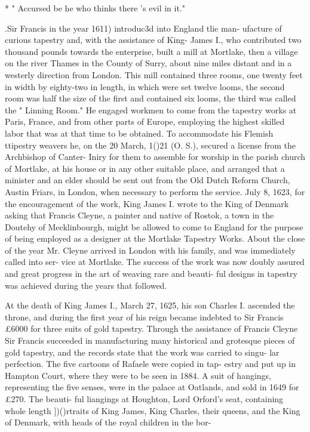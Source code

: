 \documentclass[oneside]{book}
\begin{document}
* " Accursed be he who thinks there 's evil in it." 




.Sir Francis in the year 1611) introduc3d into England tlie man- 
ufacture of curious tapestry and, with the assistance of King- 
James I., who contributed two thousand pounds towards the 
enterprise, built a mill at Mortlake, then a village on the river 
Thames in the County of Surry, about nine miles distant and in 
a westerly direction from London. This mill contained three 
rooms, one twenty feet in width by eighty-two in length, in which 
were set twelve looms, the second room was half the size of the 
first and contained six looms, the third was called the " Linning 
Room." He engaged workmen to come from the tapestry works 
at Paris, France, and from other parts of Europe, employing the 
highest skilled labor that was at that time to be obtained. To 
accommodate his Flemish ttipestry weavers he, on the 20 March, 
1()21 (O. S.), secured a license from the Archbishop of Canter- 
Iniry for them to assemble for worship in the parish church of 
Mortlake, at his house or in any other suitable place, and arranged 
that a minister and an elder should be sent out from the Old Dutch 
Reform Church, Austin Friars, in London, when necessary to 
perform the service. July 8, 1623, for the encouragement of the 
work, King James I. wrote to the King of Denmark asking that 
Francis Cleyne, a painter and native of Rostok, a town in the 
Doutehy of Mecklinbourgh, might be allowed to come to England 
for the purpose of being employed as a designer at the Mortlake 
Tapestry Works. About the close of the year Mr. Cleyne arrived 
in London with his family, and was immediately called into ser- 
vice at Mortlake. The success of the work was now doubly 
assured and great progress in the art of weaving rare and beauti- 
ful designs in tapestry was achieved during the years that followed. 

At the death of King James I., March 27, 1625, his son Charles 
I. ascended the throne, and during the first year of his reign became 
indebted to Sir Francis £6000 for three suits of gold tapestry. 
Through the assistance of Francis Cleyne Sir Francis succeeded 
in manufacturing many historical and grotesque pieces of gold 
tapestry, and the records state that the work was carried to singu- 
lar perfection. The five cartoons of Rafaele were copied in tap- 
estry and put up in Hampton Court, where they were to be seen 
in 1884. A suit of hangings, representing the five senses, were 
in the palace at Oatlands, and sold in 1649 for £270. The beauti- 
ful liangings at Houghton, Lord Orford's seat, containing whole 
length ])()rtraits of King James, King Charles, their queens, and 
the King of Denmark, with heads of the royal children in the bor- 
\end{document}
